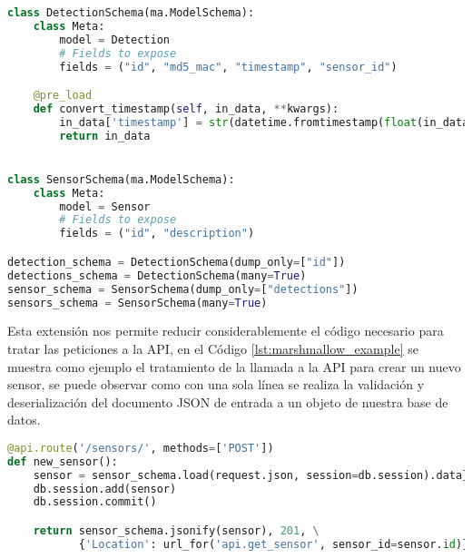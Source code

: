 \documentclass[../proyecto.tex]{subfiles}
\begin{document}
{{{\medskip

\begin{minipage}{\linewidth}
\begin{lstlisting}[language=Python, caption=Esquemas de datos de Flask-Marshmallow, label={lst:marshmallow_schemas},captionpos=b, frame=single]
class DetectionSchema(ma.ModelSchema):
    class Meta:
        model = Detection
        # Fields to expose
        fields = ("id", "md5_mac", "timestamp", "sensor_id")

    @pre_load
    def convert_timestamp(self, in_data, **kwargs):
        in_data['timestamp'] = str(datetime.fromtimestamp(float(in_data['timestamp'])))
        return in_data


class SensorSchema(ma.ModelSchema):
    class Meta:
        model = Sensor
        # Fields to expose
        fields = ("id", "description")

detection_schema = DetectionSchema(dump_only=["id"])
detections_schema = DetectionSchema(many=True)
sensor_schema = SensorSchema(dump_only=["detections"])
sensors_schema = SensorSchema(many=True)
\end{lstlisting}
\end{minipage}

\medskip

Esta extensión nos permite reducir considerablemente el código necesario para tratar las peticiones a la API, en el Código \ref{lst:marshmallow_example} se muestra como ejemplo el tratamiento de la llamada a la API para crear un nuevo sensor, se puede observar como con una sola línea se realiza la validación y deserialización del documento JSON de entrada a un objeto de nuestra base de datos.\\

\medskip

\begin{minipage}{\linewidth}
\begin{lstlisting}[language=Python, caption=Ejemplo de funcionamiento de Flask-Marshmallow, label={lst:marshmallow_example},captionpos=b, frame=single]
@api.route('/sensors/', methods=['POST'])
def new_sensor():
    sensor = sensor_schema.load(request.json, session=db.session).data}
    db.session.add(sensor)
    db.session.commit()

    return sensor_schema.jsonify(sensor), 201, \
           {'Location': url_for('api.get_sensor', sensor_id=sensor.id)}
\end{lstlisting}
\end{minipage}

}}}
\end{document}
